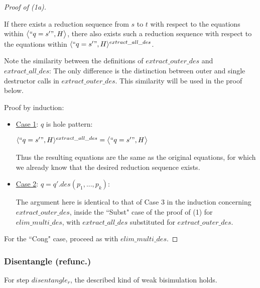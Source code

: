\documentclass[11pt]{article} %
\begin{document}
\begin{proof}[Proof of (1a)]
\begin{enumerate}
\begin{itemize}
If there exists a reduction sequence from $s$ to $t$ with respect to the equations within $\big\langle `` q = s' ", H \big\rangle$, there also exists such a reduction sequence with respect to the equations within $\langle `` q = s' ", H \rangle^{extract\_all\_des}$.

Note the similarity between the definitions of $extract\_outer\_des$ and $extract\_all\_des$: The only difference is the distinction between outer and single destructor calls in $extract\_outer\_des$. This similarity will be used in the proof below.

Proof by induction:

\begin{itemize}

\item \underline{Case 1}: $q$ is hole pattern:

$\langle `` q = s' ", H \rangle^{extract\_all\_des} = \big\langle `` q = s' ", H \big\rangle$

Thus the resulting equations are the same as the original equations, for which we already know that the desired reduction sequence exists.

\item \underline{Case 2}: $q = q'.des(p_1, ..., p_k)$:

The argument here is identical to that of Case 3 in the induction concerning $extract\_outer\_des$, inside the ``Subst" case of the proof of (1) for $elim\_multi\_des$, with $extract\_all\_des$ substituted for $extract\_outer\_des$.

\end{itemize}

\end{itemize}

\end{enumerate}

For the ``Cong" case, proceed as with $elim\_multi\_des$.

\end{proof}

\subsubsection{Disentangle (refunc.)}

For step $disentangle_r$, the described kind of weak bisimulation holds.
\end{document}

